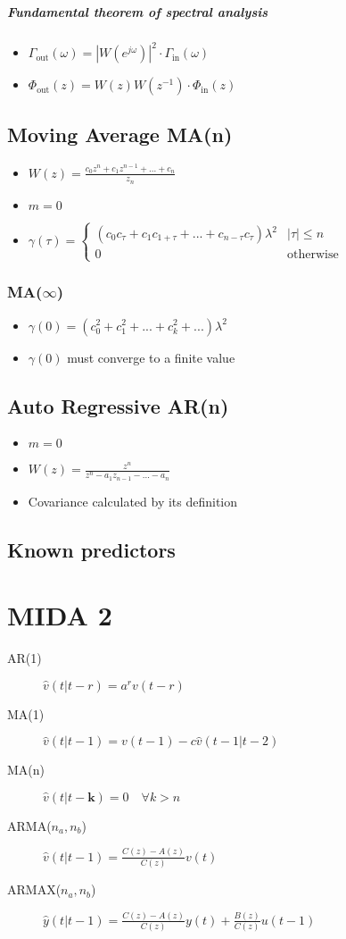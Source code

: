 \documentclass{report}
\begin{document}
\paragraph{Fundamental theorem of spectral analysis}
\begin{itemize}
\item $\Gamma_{\text{out}}(\omega)=|W(e^{j\omega})|^2 \cdot \Gamma_{\text{in}}(\omega)$
\item $\Phi_{\text{out}}(z)=W(z)W(z^{-1}) \cdot \Phi_{\text{in}}(z)$
\end{itemize}
\section{Moving Average MA(n)}
\begin{itemize}
\item $W(z)=\frac{c_0z^n+c_1z^{n-1}+...+c_n}{z_n}$
\item $m=0$
\item $\gamma(\tau)= 
\begin{cases}
(c_0c_\tau+c_1c_{1+\tau}+...+c_{n-\tau}c_\tau)\lambda^2	&	|\tau|\leq n\\
0	& \text{otherwise}
\end{cases}$
\end{itemize}
\subsection{MA($\infty$)}
\begin{itemize}
\item $\gamma(0)=(c_0^2+c_1^2+...+c_k^2+...)\lambda^2$
\item $\gamma(0)$ must converge to a finite value
\end{itemize}
\section{Auto Regressive AR(n)}
\begin{itemize}
\item $m=0$
\item $W(z)=\frac{z^n}{z^n-a_1z_{n-1}-...-a_n}$
\item Covariance calculated by its definition
\end{itemize}

\section{Known predictors}
\chapter{MIDA 2}
\begin{description}
\item[AR(1)] $\hat{v}(t|t-r)=a^rv(t-r)$
\item[MA(1)] $\hat{v}(t|t-1)=v(t-1)-c\hat{v}(t-1|t-2)$
\item[MA(n)] $\hat{v}(t|t-\textbf{k})=0 \quad \forall k>n$
\item[ARMA($n_a,n_b$)] $\hat{v}(t|t-1)=
\frac{C(z)-A(z)}{C(z)}v(t)$
\item[ARMAX($n_a,n_b$)] $\hat{y}(t|t-1)=
\frac{C(z)-A(z)}{C(z)}y(t)
+\frac{B(z)}{C(z)}u(t-1)$
\end{description}
\end{document}

